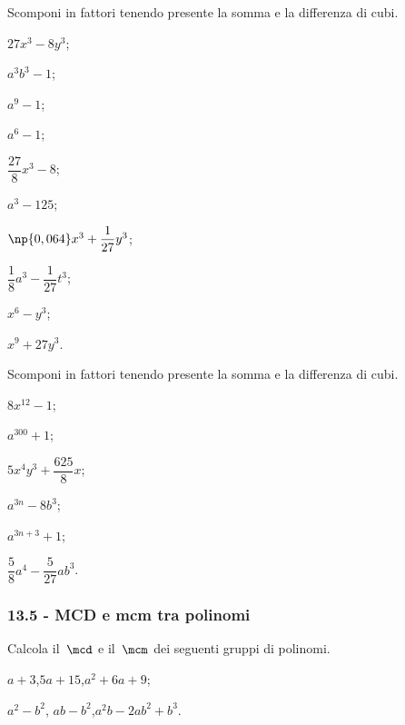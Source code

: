 \begin{esercizio}
\label{ese:13.86}
 Scomponi in fattori tenendo presente la somma e la differenza di cubi.
 \begin{multicols}{3}
 \begin{enumeratea}
  \item $27x^{3}-8y^{3}$;
 \item $a^{3}b^{3}-1$;
 \item $a^{9}-1$;
 \item $a^{6}-1$;
 \item $\dfrac{27}{8}x^{3}-8$;
 \item $a^{3}-125$;
 \item $\np{0,064}x^{3}+\dfrac{1}{27}y^{3}$;
 \item $\dfrac{1}{8}a^{3}-\dfrac{1}{27}t^{3}$;
 \item $x^{6}-y^{3}$;
 \item $x^{9}+27y^{3}$.
 \end{enumeratea}
 \end{multicols}
\end{esercizio}

\begin{esercizio}
\label{ese:13.87}
 Scomponi in fattori tenendo presente la somma e la differenza di cubi.
 \begin{multicols}{3}
 \begin{enumeratea}
 \item $8x^{12}-1$;
 \item $a^{300}+1$;
\item $5x^{4}y^{3}+\dfrac{625}{8}x$;
 \item $a^{3n}-8b^{3}$;
 \item $a^{3n+3}+1$;
 \item $\dfrac{5}{8}a^{4}-\dfrac{5}{27}ab^{3}$.
 \end{enumeratea}
 \end{multicols}
\end{esercizio}

\subsubsection*{13.5 - MCD e mcm tra polinomi}

\begin{esercizio}[\Ast]
\label{ese:13.88}
Calcola il~$\mcd$ e il~$\mcm$ dei seguenti gruppi di polinomi.
\begin{multicols}{2}
\begin{enumeratea}
 \item $a+3$,\quad $5a+15$,\quad $a^{2}+6a+9$;
 \item $a^{2}-b^{2}$, $ab-b^{2}$,\quad $a^{2}b-2ab^{2}+b^{3}$.
\end{enumeratea}
\end{multicols}
\end{esercizio}

